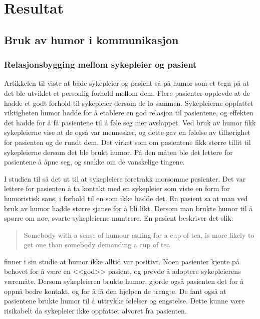 \chapter{Resultat}

\section{Bruk av humor i kommunikasjon}

\subsection{Relasjonsbygging mellom sykepleier og pasient}
\label{res.relbygg}

Artikkelen til  viste at både sykepleier og pasient så på
humor som et tegn på at det ble utviklet et personlig forhold mellom dem. Flere
pasienter opplevde at de hadde et godt forhold til sykepleier dersom de lo
sammen. Sykepleierne oppfattet viktigheten humor hadde for å etablere en god
relasjon til pasientene, og effekten det hadde for å få pasientene til å føle
seg mer avslappet. Ved bruk av humor fikk sykepleierne vise at de også var
mennesker, og dette gav en følelse av tilhørighet for pasienten og de rundt
dem. Det virket som om pasientene fikk større tillit til sykepleierne dersom
det ble brukt humor. På den måten ble det lettere for pasientene å åpne seg, og
snakke om de vanskelige tingene.

I studien til  så det ut til at sykepleiere foretrakk
morsomme pasienter. Det var lettere for pasienten å ta kontakt med en
sykepleier som viste en form for humoristisk sans, i forhold til en som ikke
hadde det. En pasient sa at man ved bruk av humor hadde større sjanse for å bli
likt. Dersom man brukte humor til å spørre om noe, svarte sykepleierne
muntrere. En pasient beskriver det slik:
\blockquote[{}]{Somebody with a sense of humour asking
for a cup of tea, is more likely to get one than somebody demanding a cup of
tea}.

 finner i sin studie at humor ikke alltid var
positivt. Noen pasienter kjente på behovet for å være en <<god>> pasient, og
prøvde å adoptere sykepleierens væremåte. Dersom sykepleieren brukte humor,
gjorde også pasienten det for å oppnå bedre kontakt, og for å få den hjelpen de
trengte. De fant også at pasientene brukte humor til å uttrykke følelser og
engstelse. Dette kunne være risikabelt da sykepleier ikke oppfattet alvoret fra
pasienten.

